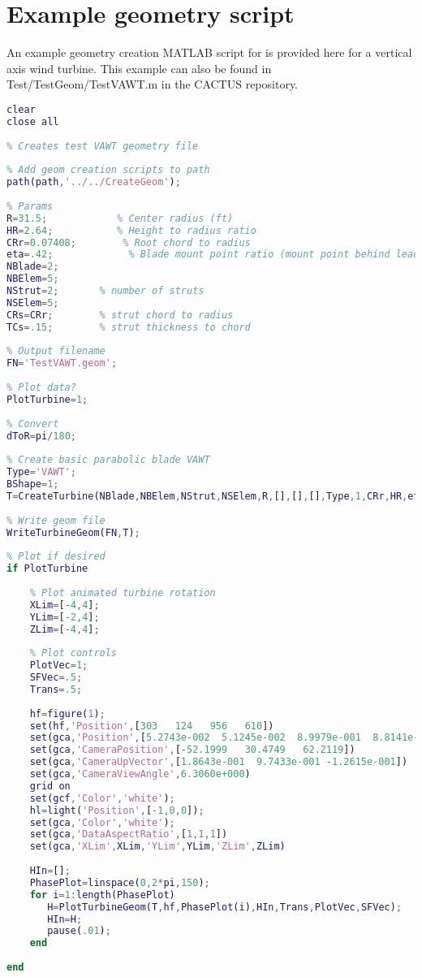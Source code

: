 \chapter{Example geometry script}
\label{sec:example_geometry_script}
An example geometry creation MATLAB script for is provided here for a vertical axis wind turbine. This example can also be found in Test/TestGeom/TestVAWT.m in the CACTUS repository.

\begin{lstlisting}[language=matlab]
clear
close all
 
% Creates test VAWT geometry file
 
% Add geom creation scripts to path
path(path,'../../CreateGeom');
 
% Params
R=31.5;            % Center radius (ft)
HR=2.64;           % Height to radius ratio 
CRr=0.07408;        % Root chord to radius
eta=.42;             % Blade mount point ratio (mount point behind leading edge as a fraction of chord)
NBlade=2;
NBElem=5;
NStrut=2;       % number of struts
NSElem=5;
CRs=CRr;        % strut chord to radius
TCs=.15;        % strut thickness to chord
 
% Output filename
FN='TestVAWT.geom';
 
% Plot data?
PlotTurbine=1;
 
% Convert
dToR=pi/180;
 
% Create basic parabolic blade VAWT
Type='VAWT';
BShape=1;
T=CreateTurbine(NBlade,NBElem,NStrut,NSElem,R,[],[],[],Type,1,CRr,HR,eta,BShape,CRs,TCs);
 
% Write geom file
WriteTurbineGeom(FN,T);
 
% Plot if desired
if PlotTurbine
    
    % Plot animated turbine rotation
    XLim=[-4,4];
    YLim=[-2,4];
    ZLim=[-4,4];
    
    % Plot controls
    PlotVec=1;
    SFVec=.5;
    Trans=.5;
    
    hf=figure(1);
    set(hf,'Position',[303   124   956   610]) 
    set(gca,'Position',[5.2743e-002  5.1245e-002  8.9979e-001  8.8141e-001])
    set(gca,'CameraPosition',[-52.1999   30.4749   62.2119])
    set(gca,'CameraUpVector',[1.8643e-001  9.7433e-001 -1.2615e-001])
    set(gca,'CameraViewAngle',6.3060e+000)
    grid on
    set(gcf,'Color','white');
    hl=light('Position',[-1,0,0]);
    set(gca,'Color','white');
    set(gca,'DataAspectRatio',[1,1,1])
    set(gca,'XLim',XLim,'YLim',YLim,'ZLim',ZLim)
    
    HIn=[];
    PhasePlot=linspace(0,2*pi,150);
    for i=1:length(PhasePlot)
       H=PlotTurbineGeom(T,hf,PhasePlot(i),HIn,Trans,PlotVec,SFVec);
       HIn=H;
       pause(.01);
    end
    
end
\end{lstlisting}